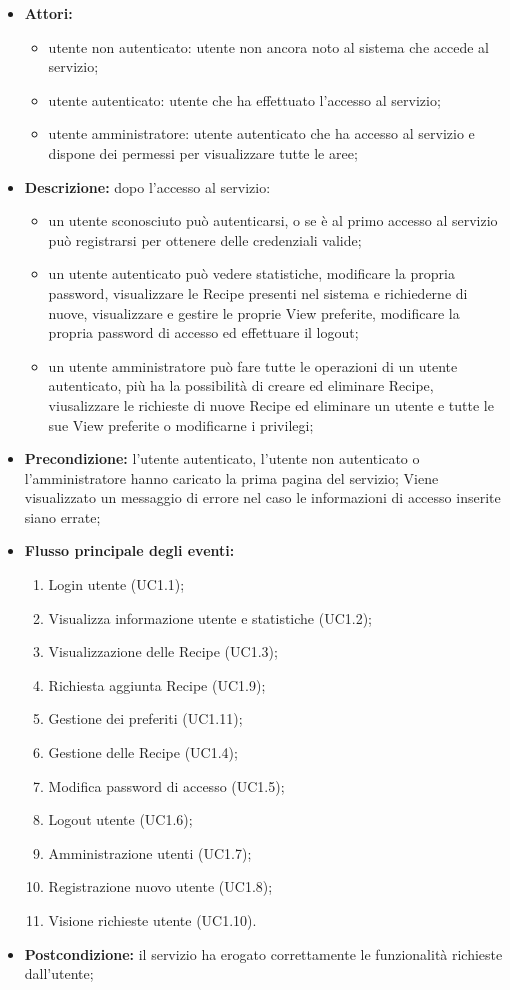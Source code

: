 \begin{itemize}
	\item \textbf{Attori:}
	\begin{itemize}
		\item utente non autenticato: utente non ancora noto al sistema che accede al servizio;
		\item utente autenticato: utente che ha effettuato l'accesso al servizio;
		\item utente amministratore: utente autenticato che ha accesso al servizio e dispone dei permessi per visualizzare tutte le aree;
	\end{itemize}
	\item \textbf{Descrizione:} dopo l'accesso al servizio:
	\begin{itemize}
		\item un utente sconosciuto può autenticarsi, o se è al primo accesso al servizio può registrarsi per ottenere delle credenziali valide;
		\item un utente autenticato può vedere statistiche, modificare la propria password, visualizzare le Recipe presenti nel sistema e richiederne di nuove, visualizzare e gestire le proprie View preferite, modificare la propria password di accesso ed effettuare il logout;
		\item un utente amministratore può fare tutte le operazioni di un utente autenticato, più ha la possibilità di creare ed eliminare Recipe, viusalizzare le richieste di nuove Recipe ed eliminare un utente e tutte le sue View preferite o modificarne i privilegi;
	\end{itemize}
	\item \textbf{Precondizione:} l'utente autenticato, l'utente non autenticato o l'amministratore hanno caricato la prima pagina del servizio;
	Viene visualizzato un messaggio di errore nel caso le informazioni di accesso inserite siano errate;
	\item \textbf{Flusso principale degli eventi:}
	\begin{enumerate}
		\item Login utente (UC1.1);
		\item Visualizza informazione utente e statistiche (UC1.2);
		\item Visualizzazione delle Recipe (UC1.3);
		\item Richiesta aggiunta Recipe (UC1.9);
		\item Gestione dei preferiti (UC1.11);
		\item Gestione delle Recipe (UC1.4);
		\item Modifica password di accesso (UC1.5);
		\item Logout utente (UC1.6);
		\item Amministrazione utenti (UC1.7);
		\item Registrazione nuovo utente (UC1.8);
		\item Visione richieste utente (UC1.10).
	\end{enumerate}
	\item \textbf{Postcondizione:} il servizio ha erogato correttamente le funzionalità richieste dall'utente;
\end{itemize}

